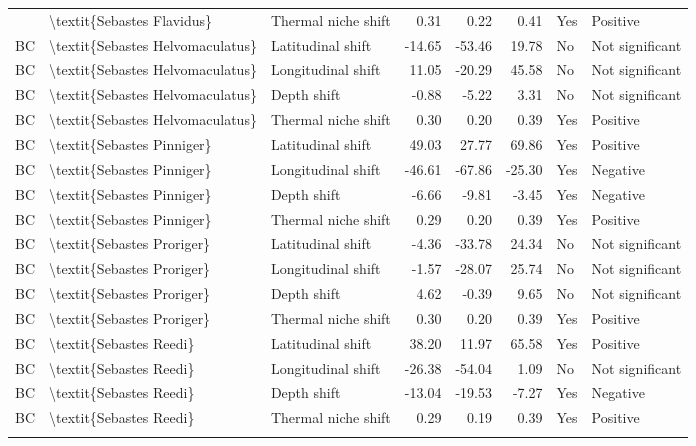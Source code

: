 \begin{longtable}[t]{lllrrrll}
{{BC & \textbackslash{}textit\{Sebastes Flavidus\} & Thermal niche shift & 0.31 & 0.22 & 0.41 & Yes & Positive\\
\addlinespace
BC & \textbackslash{}textit\{Sebastes Helvomaculatus\} & Latitudinal shift & -14.65 & -53.46 & 19.78 & No & Not significant\\
BC & \textbackslash{}textit\{Sebastes Helvomaculatus\} & Longitudinal shift & 11.05 & -20.29 & 45.58 & No & Not significant\\
BC & \textbackslash{}textit\{Sebastes Helvomaculatus\} & Depth shift & -0.88 & -5.22 & 3.31 & No & Not significant\\
BC & \textbackslash{}textit\{Sebastes Helvomaculatus\} & Thermal niche shift & 0.30 & 0.20 & 0.39 & Yes & Positive\\
BC & \textbackslash{}textit\{Sebastes Pinniger\} & Latitudinal shift & 49.03 & 27.77 & 69.86 & Yes & Positive\\
\addlinespace
BC & \textbackslash{}textit\{Sebastes Pinniger\} & Longitudinal shift & -46.61 & -67.86 & -25.30 & Yes & Negative\\
BC & \textbackslash{}textit\{Sebastes Pinniger\} & Depth shift & -6.66 & -9.81 & -3.45 & Yes & Negative\\
BC & \textbackslash{}textit\{Sebastes Pinniger\} & Thermal niche shift & 0.29 & 0.20 & 0.39 & Yes & Positive\\
BC & \textbackslash{}textit\{Sebastes Proriger\} & Latitudinal shift & -4.36 & -33.78 & 24.34 & No & Not significant\\
BC & \textbackslash{}textit\{Sebastes Proriger\} & Longitudinal shift & -1.57 & -28.07 & 25.74 & No & Not significant\\
\addlinespace
BC & \textbackslash{}textit\{Sebastes Proriger\} & Depth shift & 4.62 & -0.39 & 9.65 & No & Not significant\\
BC & \textbackslash{}textit\{Sebastes Proriger\} & Thermal niche shift & 0.30 & 0.20 & 0.39 & Yes & Positive\\
BC & \textbackslash{}textit\{Sebastes Reedi\} & Latitudinal shift & 38.20 & 11.97 & 65.58 & Yes & Positive\\
BC & \textbackslash{}textit\{Sebastes Reedi\} & Longitudinal shift & -26.38 & -54.04 & 1.09 & No & Not significant\\
BC & \textbackslash{}textit\{Sebastes Reedi\} & Depth shift & -13.04 & -19.53 & -7.27 & Yes & Negative\\
\addlinespace
BC & \textbackslash{}textit\{Sebastes Reedi\} & Thermal niche shift & 0.29 & 0.19 & 0.39 & Yes & Positive\\
}}
\end{longtable}
